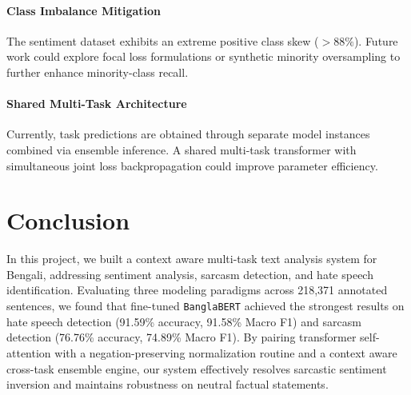 \documentclass[11pt,a4paper]{article}
\begin{document}
\paragraph{Class Imbalance Mitigation} The sentiment dataset exhibits an extreme positive class skew ($>88\%$). Future work could explore focal loss formulations or synthetic minority oversampling to further enhance minority-class recall.

\paragraph{Shared Multi-Task Architecture} Currently, task predictions are obtained through separate model instances combined via ensemble inference. A shared multi-task transformer with simultaneous joint loss backpropagation could improve parameter efficiency.

\section{Conclusion}
In this project, we built a context aware multi-task text analysis system for Bengali, addressing sentiment analysis, sarcasm detection, and hate speech identification. Evaluating three modeling paradigms across 218,371 annotated sentences, we found that fine-tuned \texttt{BanglaBERT} achieved the strongest results on hate speech detection (91.59\% accuracy, 91.58\% Macro F1) and sarcasm detection (76.76\% accuracy, 74.89\% Macro F1). By pairing transformer self-attention with a negation-preserving normalization routine and a context aware cross-task ensemble engine, our system effectively resolves sarcastic sentiment inversion and maintains robustness on neutral factual statements.
\end{document}

